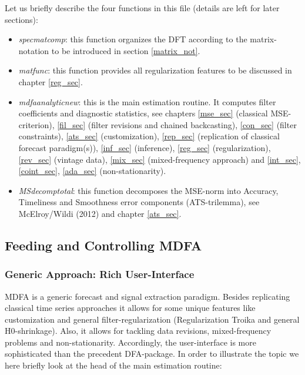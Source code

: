 \documentclass[a4paper]{book}
\begin{document}
Let us briefly describe the four functions in this file (details are left for later sections):
\begin{itemize}
\item \emph{spec\textunderscore mat\textunderscore comp}: this function organizes the DFT according to the matrix-notation to be introduced in section \ref{matrix_not}.
\item \emph{mat\textunderscore func}: this function provides all regularization features to be discussed in chapter \ref{reg_sec}.
\item \emph{mdfa\textunderscore analytic\textunderscore new}: this is the main estimation routine. It computes filter coefficients and diagnostic statistics, see chapters \ref{mse_sec} (classical MSE-criterion), \ref{fil_sec} (filter revisions and chained backcasting), \ref{con_sec} (filter constraints), \ref{ats_sec} (customization), \ref{rep_sec} (replication of classical forecast paradigm(s)), \ref{inf_sec} (inference), \ref{reg_sec} (regularization), \ref{rev_sec} (vintage data), \ref{mix_sec} (mixed-frequency approach) and \ref{int_sec}, \ref{coint_sec}, \ref{ada_sec} (non-stationarity). 
\item \emph{MS\textunderscore decomp\textunderscore total}: this function decomposes the MSE-norm into Accuracy, Timeliness and Smoothness error components (ATS-trilemma), see McElroy/Wildi (2012) and chapter \ref{ats_sec}. 
\end{itemize}

\subsection{Feeding and Controlling MDFA}\label{control_dfa}

\subsubsection{Generic Approach: Rich User-Interface}

MDFA is a generic forecast and signal extraction paradigm. Besides replicating classical time series approaches it allows for some unique features like customization and  general filter-regularization (Regularization Troika and general H0-shrinkage). Also, it allows for tackling data revisions, mixed-frequency problems and non-stationarity. Accordingly, the user-interface is more sophisticated than the precedent DFA-package. In order to illustrate the topic we here briefly look at the head of the main estimation routine:    
\end{document}
